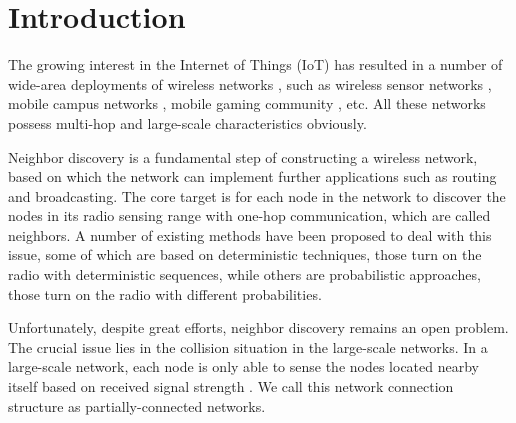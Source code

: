 \section{Introduction}






The growing interest in the Internet of Things (IoT) has resulted 
in a number of wide-area deployments of wireless networks \cite{qin2014software},
such as wireless sensor networks \cite{yick2008wireless}, mobile campus networks 
\cite{hernandez2005comparative}, mobile gaming community \cite{cunningham2002optimizing}, etc.
All these networks possess multi-hop and large-scale characteristics obviously.

Neighbor discovery is a fundamental step of constructing a wireless network, based on 
which the network can implement further applications such as routing and broadcasting.
The core target is for each node in the network to discover the nodes in its radio sensing range 
with one-hop communication, which are called neighbors. 
A number of existing methods \cite{dutta2008practical,kandhalu2010u,
bakht2012searchlight,sun2014hello,chen2015heterogeneous,
wang2015blinddate,qiu2016talk,mcglynn2001birthday,
vasudevan2009neighbor,you2011aloha,song2014probabilistic} have been proposed 
to deal with this issue, some of which are based on deterministic techniques, 
those turn on the radio with deterministic sequences,
 while others are probabilistic approaches, those turn on the radio with different probabilities.


Unfortunately, despite great efforts, neighbor discovery remains an open problem.
The crucial issue lies in the collision situation in the large-scale networks.
In a large-scale network, each node is only able to sense the 
nodes located nearby itself based on received signal strength \cite{wang2013gaussian}.  
We call this network connection structure as partially-connected networks.


